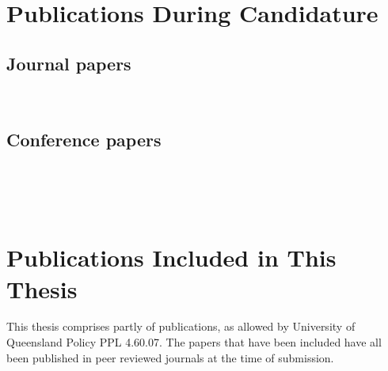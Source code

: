 \section*{Publications During Candidature}

\subsection*{Journal papers}

\noindent{}\\


\subsection*{Conference papers}

\noindent{}\\

\noindent{}\\

\noindent{}\\

\section*{Publications Included in This Thesis}

This thesis comprises partly of publications, as allowed by University of Queensland Policy PPL 4.60.07. The papers that have been included have all been published in peer reviewed journals at the time of submission. 

\vspace{\baselineskip}

